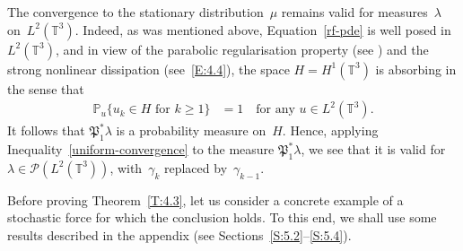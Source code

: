 \documentclass[JEP,XML,SOM,Unicode,ThmDefs]{cedram}
\let\mathcal\mathscr
\theoremstyle{plain}
\numberwithin{equation}{section}
\newcommand{\IP}{{\mathbb P}}
\newcommand{\T}{{\mathbb T}}
\newcommand{\PP}{{\mathcal P}}
\newcommand{\PPPP}{{\mathfrak P}}
\begin{document}
\begin{remark}
The convergence to the stationary distribution~$\mu$ remains valid for measures~$\lambda$ on~$L^2(\T^3)$. Indeed, as was mentioned above, Equation~\eqref{rf-pde} is well posed in~$L^2(\T^3)$, and in view of the parabolic regularisation property (\eg see \cite[Chap.\,1,\,\S5]{BV1992}) and the strong nonlinear dissipation (see~\eqref{E:4.4}), the space $H=H^1(\T^3)$ is absorbing in the sense that
\begin{align}
\IP_u\{u_k\in H\text{ for $k\ge1$}\}&=1 \quad\text{for any $u\in L^2(\T^3)$}.
\label{absorption}
\end{align}
It follows that $\PPPP_1^*\lambda$ is a probability measure on~$H$. Hence, applying Inequality~\eqref{uniform-convergence} to the measure $\PPPP_1^*\lambda$, we see that it is valid for $\lambda\in\PP(L^2(\T^3))$, with~$\gamma_k$ replaced by~$\gamma_{k-1}$.
\end{remark}

Before proving Theorem~\ref{T:4.3}, let us consider a concrete example of a stochastic force for which the conclusion holds. To this end, we shall use some results described in the appendix (see Sections~\ref{S:5.2}--\ref{S:5.4}).
\end{document}
